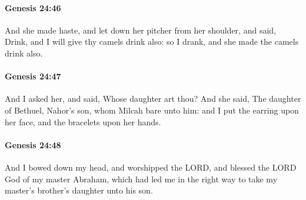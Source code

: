 		\paragraph{Genesis 24:46} %
			\label{GENESIS-24-46}

			And she made haste, and let down her pitcher from her shoulder, and said, Drink, and I will give thy camels drink also: so I drank, and she made the camels drink also.


		\paragraph{Genesis 24:47} %
			\label{GENESIS-24-47}

			And I asked her, and said, Whose daughter art thou?  And she said, The daughter of Bethuel, Nahor's son, whom Milcah bare unto him: and I put the earring upon her face, and the bracelets upon her hands.


		\paragraph{Genesis 24:48} %
			\label{GENESIS-24-48}

			And I bowed down my head, and worshipped the LORD, and blessed the LORD God of my master Abraham, which had led me in the right way to take my master's brother's daughter unto his son.


